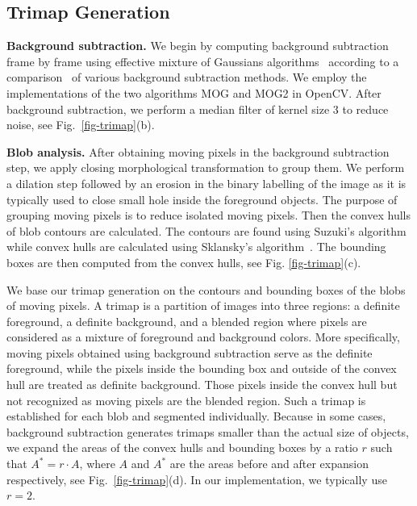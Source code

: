 \subsection{Trimap Generation}
\label{method-tg}

\textbf{Background subtraction.}
We begin by computing background subtraction frame by frame using effective  mixture of Gaussians algorithms~\cite{kaewtrakulpong2002,zivkovic2004} according to a comparison~\cite{sobral2014} of various background subtraction methods. We employ the implementations of the two algorithms MOG and MOG2 in OpenCV. After background subtraction, we perform a median filter of kernel size 3 to reduce noise, see Fig.~\ref{fig-trimap}(b).

\textbf{Blob analysis.}
After obtaining moving pixels in the background subtraction step, we apply closing morphological transformation to group them. We perform a dilation step followed by an erosion in the binary labelling of the image as it is typically used to close small hole inside the foreground objects.
The purpose of grouping moving pixels is to reduce isolated moving pixels.
Then the convex hulls of blob contours are calculated. The contours are found using Suzuki's algorithm~\cite{suzuki1985} while convex hulls are calculated using Sklansky's algorithm~\cite{sklansky1982}. The bounding boxes are then computed from the convex hulls, see Fig. \ref{fig-trimap}(c).

We base our trimap generation on the contours and bounding boxes of the blobs of moving pixels.
A trimap is a partition of images into three regions: a definite foreground, a definite background, and a blended region where pixels are considered as a mixture of foreground and background colors.
More specifically, moving pixels obtained using background subtraction serve as the definite foreground, while the pixels inside the bounding box and outside of the convex hull are treated as definite background.
Those pixels inside the convex hull but not recognized as moving pixels are the blended region.
Such a trimap is established for each blob and segmented individually.
Because in some cases, background subtraction generates trimaps smaller than the actual size of objects, we expand the areas of the convex hulls and bounding boxes by a ratio $r$ such that $A^{*}=r\cdot A$, where $A$ and $A^{*}$ are the areas before and after expansion respectively, see Fig.~\ref{fig-trimap}(d).  In our implementation, we typically use $r=2$.

